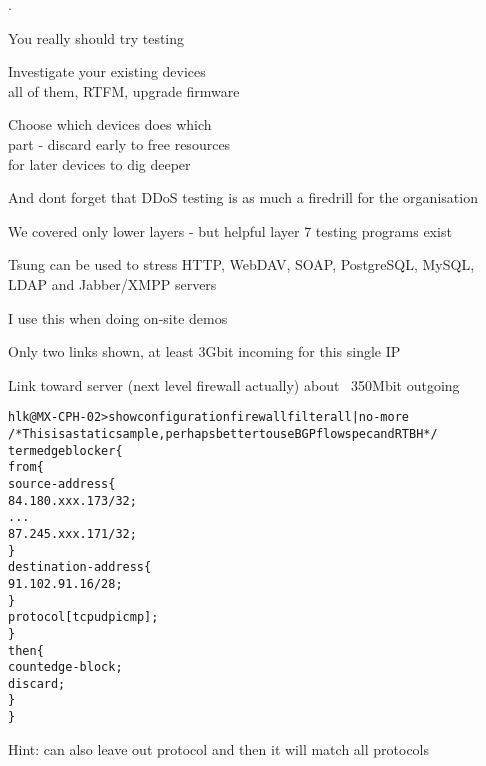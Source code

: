 \documentclass[20pt,landscape,a4paper,footrule]{foils}
\begin{document}

.
\begin{list1}
\item You really should try testing
\item Investigate your existing devices\\
all of them, RTFM, upgrade firmware
\item Choose which devices does which\\
part - discard early to free resources\\
for later devices to dig deeper
\end{list1}

\vskip 2cm
\centerline{And dont forget that DDoS testing is as much a firedrill for the organisation}



\begin{list1}
\item We covered only lower layers - but helpful layer 7 testing programs exist
\item Tsung can be used to stress HTTP, WebDAV, SOAP, PostgreSQL, MySQL, LDAP and Jabber/XMPP servers 
\end{list1}

\myquestionspage




I use this when doing on-site demos




\centerline{Only two links shown, at least 3Gbit incoming for this single IP}

\centerline{Link toward server (next level firewall actually) about ~350Mbit outgoing}



\begin{alltt}\footnotesize
hlk@MX-CPH-02> show configuration firewall filter all | no-more
/* This is a static sample, perhaps better to use BGP flowspec and RTBH */
term edgeblocker \{
    from \{
        source-address \{
            84.180.xxx.173/32;
...
            87.245.xxx.171/32;
        \}
        destination-address \{
            91.102.91.16/28;
        \}
        protocol [ tcp udp icmp ];
    \}
    then \{
        count edge-block;
        discard;
    \}
\}
\end{alltt}
Hint: can also leave out protocol and then it will match all protocols
\end{document}
